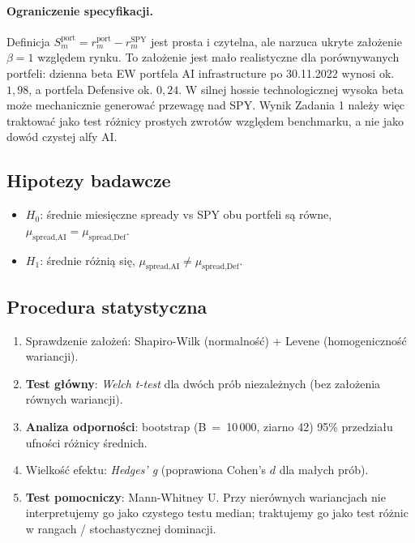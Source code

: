 \documentclass[11pt,a4paper]{article}
\begin{document}
\paragraph{Ograniczenie specyfikacji.}
Definicja $S^{\text{port}}_m = r^{\text{port}}_m - r^{\text{SPY}}_m$ jest
prosta i czytelna, ale narzuca ukryte założenie $\beta = 1$ względem rynku.
To założenie jest mało realistyczne dla porównywanych portfeli: dzienna beta
EW portfela AI infrastructure po 30.11.2022 wynosi ok. $1{,}98$, a portfela
Defensive ok. $0{,}24$. W silnej hossie technologicznej wysoka beta może
mechanicznie generować przewagę nad SPY. Wynik Zadania 1 należy więc traktować
jako test różnicy prostych zwrotów względem benchmarku, a nie jako dowód
czystej alfy AI.

\subsection{Hipotezy badawcze}
\begin{itemize}
  \item $H_0$: średnie miesięczne spready vs SPY obu portfeli są równe,
        $\mu_{\text{spread},\text{AI}} = \mu_{\text{spread},\text{Def}}$.
  \item $H_1$: średnie różnią się,
        $\mu_{\text{spread},\text{AI}} \neq \mu_{\text{spread},\text{Def}}$.
\end{itemize}

\subsection{Procedura statystyczna}
\begin{enumerate}
  \item Sprawdzenie założeń: Shapiro-Wilk (normalność) + Levene (homogeniczność
        wariancji).
  \item \textbf{Test główny}: \emph{Welch t-test} dla dwóch prób niezależnych
        (bez założenia równych wariancji).
  \item \textbf{Analiza odporności}: bootstrap (B~=~10\,000, ziarno 42)
        95\% przedziału ufności różnicy średnich.
  \item Wielkość efektu: \emph{Hedges' g} (poprawiona Cohen's $d$ dla małych
        prób).
  \item \textbf{Test pomocniczy}: Mann-Whitney U. Przy nierównych wariancjach
        nie interpretujemy go jako czystego testu median; traktujemy go jako
        test różnic w rangach / stochastycznej dominacji.
\end{enumerate}
\end{document}
